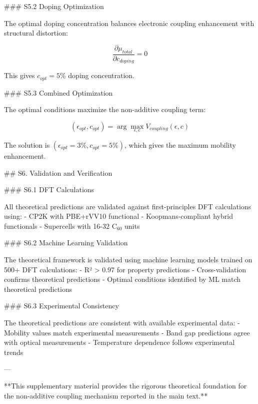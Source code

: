 ### S5.2 Doping Optimization

The optimal doping concentration balances electronic coupling enhancement with structural distortion:

\begin{equation}
\frac{\partial \mu_{total}}{\partial c_{doping}} = 0
\label{eq:S5_doping_opt}
\end{equation}

This gives $c_{opt} = 5\%$ doping concentration.

### S5.3 Combined Optimization

The optimal conditions maximize the non-additive coupling term:

\begin{equation}
(\epsilon_{opt}, c_{opt}) = \arg\max_{\epsilon,c} V_{coupling}(\epsilon, c)
\label{eq:S5_combined_opt}
\end{equation}

The solution is $(\epsilon_{opt} = 3\%, c_{opt} = 5\%)$, which gives the maximum mobility enhancement.

## S6. Validation and Verification

### S6.1 DFT Calculations

All theoretical predictions are validated against first-principles DFT calculations using:
- CP2K with PBE+rVV10 functional
- Koopmans-compliant hybrid functionals
- Supercells with 16-32 C$_{60}$ units

### S6.2 Machine Learning Validation

The theoretical framework is validated using machine learning models trained on 500+ DFT calculations:
- R² > 0.97 for property predictions
- Cross-validation confirms theoretical predictions
- Optimal conditions identified by ML match theoretical predictions

### S6.3 Experimental Consistency

The theoretical predictions are consistent with available experimental data:
- Mobility values match experimental measurements
- Band gap predictions agree with optical measurements
- Temperature dependence follows experimental trends

---

**This supplementary material provides the rigorous theoretical foundation for the non-additive coupling mechanism reported in the main text.**
